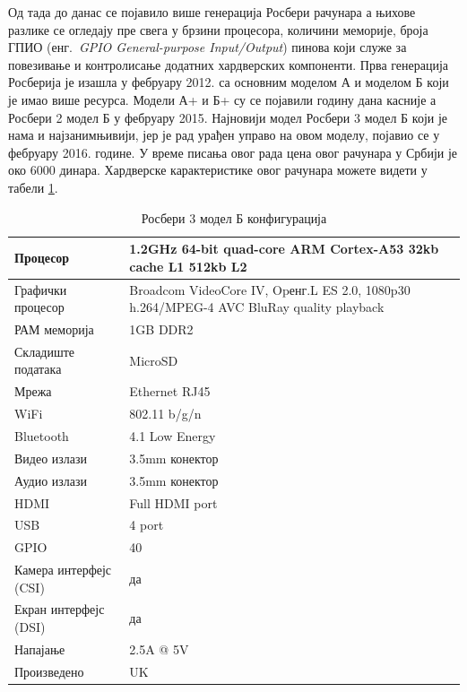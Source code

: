 \documentclass[12pt,oneside]{memoir}
\theoremstyle{remark}
\begin{document}
Од тада до данас се појавило више генерација Росбери рачунара а њихове разлике се огледају пре свега у брзини процесора, количини меморије, броја ГПИО (енг.~{\em GPIO General-purpose Input/Output}) пинова који служе за повезивање и контролисање додатних хардверских компоненти. Прва генерација Росберија је изашла у фебруару 2012. са основним моделом А и моделом Б који је имао више ресурса. Модели А+ и Б+ су се појавили годину дана касније а Росбери 2 модел Б у фебруару 2015. Најновији модел Росбери 3 модел Б који је нама и најзанимњивији, јер је рад урађен управо на овом моделу, појавио се у фебруару 2016. године. У време писања овог рада цена овог рачунара у Србији је око 6000 динара. Хардверске карактеристике овог рачунара можете видети у табели \ref{tbl:rpikonfiguracija}.

\begin{table}
\centering
\caption{Росбери 3 модел Б конфигурација}
\label{tbl:rpikonfiguracija}
\begin{tabular}{ |p{4cm}||p{10cm}|}
	\hline
	Процесор & 1.2GHz 64-bit quad-core ARM Cortex-A53 32kb cache L1 512kb L2\\
	\hline
	Графички процесор & Broadcom VideoCore IV, Opенг.L ES 2.0, 1080p30 h.264/MPEG-4 AVC BluRay quality playback\\
	\hline
	РАМ меморија &  1GB DDR2\\
	\hline
	Складиште података & MicroSD\\
	\hline
	Мрежа & Ethernet RJ45\\
	\hline	
	WiFi & 802.11 b/g/n\\
	\hline
	Bluetooth & 4.1  Low Energy\\
	\hline
	Видео излази & 3.5mm конектор\\
	\hline
	Аудио излази & 3.5mm конектор\\
	\hline
	HDMI & Full HDMI port\\
	\hline
	USB & 4 port\\
	\hline
	GPIO & 40\\
	\hline
	Камера интерфејс (CSI) & да\\
	\hline
	Екран интерфејс (DSI) & да\\
	\hline
	Напајање &  2.5A @ 5V\\
	\hline
	Произведено & UK\\
	\hline
\end{tabular}
\end{table}
\end{document}
